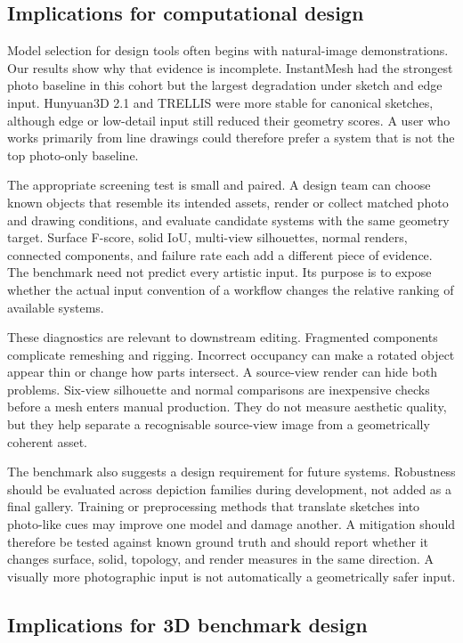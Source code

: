 \documentclass[12pt,a4paper]{article}
\begin{document}
\subsection{Implications for computational design}

Model selection for design tools often begins with natural-image demonstrations. Our results show why that evidence is incomplete. InstantMesh had the strongest photo baseline in this cohort but the largest degradation under sketch and edge input. Hunyuan3D 2.1 and TRELLIS were more stable for canonical sketches, although edge or low-detail input still reduced their geometry scores. A user who works primarily from line drawings could therefore prefer a system that is not the top photo-only baseline.

The appropriate screening test is small and paired. A design team can choose known objects that resemble its intended assets, render or collect matched photo and drawing conditions, and evaluate candidate systems with the same geometry target. Surface F-score, solid IoU, multi-view silhouettes, normal renders, connected components, and failure rate each add a different piece of evidence. The benchmark need not predict every artistic input. Its purpose is to expose whether the actual input convention of a workflow changes the relative ranking of available systems.

These diagnostics are relevant to downstream editing. Fragmented components complicate remeshing and rigging. Incorrect occupancy can make a rotated object appear thin or change how parts intersect. A source-view render can hide both problems. Six-view silhouette and normal comparisons are inexpensive checks before a mesh enters manual production. They do not measure aesthetic quality, but they help separate a recognisable source-view image from a geometrically coherent asset.

The benchmark also suggests a design requirement for future systems. Robustness should be evaluated across depiction families during development, not added as a final gallery. Training or preprocessing methods that translate sketches into photo-like cues may improve one model and damage another. A mitigation should therefore be tested against known ground truth and should report whether it changes surface, solid, topology, and render measures in the same direction. A visually more photographic input is not automatically a geometrically safer input.

\subsection{Implications for 3D benchmark design}
\end{document}
